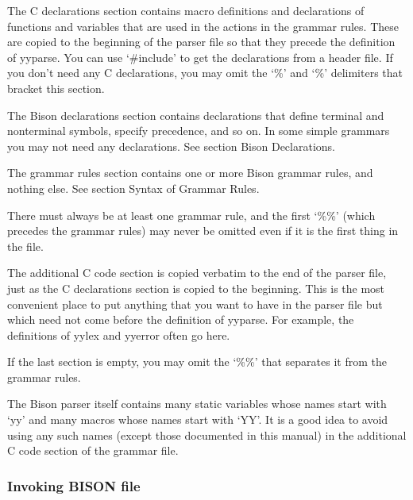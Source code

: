 
The C declarations section contains macro definitions and declarations of functions and variables that are used in the actions in the grammar rules. These are copied to the beginning of the parser file so that they precede the definition of yyparse. You can use `\#include' to get the declarations from a header file. If you don't need any C declarations, you may omit the `\%{' and `\%}' delimiters that bracket this section.


The Bison declarations section contains declarations that define terminal and nonterminal symbols, specify precedence, and so on. In some simple grammars you may not need any declarations. See section Bison Declarations.


The grammar rules section contains one or more Bison grammar rules, and nothing else. See section Syntax of Grammar Rules.

There must always be at least one grammar rule, and the first `\%\%' (which precedes the grammar rules) may never be omitted even if it is the first thing in the file.


The additional C code section is copied verbatim to the end of the parser file, just as the C declarations section is copied to the beginning. This is the most convenient place to put anything that you want to have in the parser file but which need not come before the definition of yyparse. For example, the definitions of yylex and yyerror often go here. \newline

 If the last section is empty, you may omit the `\%\%' that separates it from the grammar rules.\newline

The Bison parser itself contains many static variables whose names start with `yy' and many macros whose names start with `YY'. It is a good idea to avoid using any such names (except those documented in this manual) in the additional C code section of the grammar file.

\subsubsection{Invoking BISON file}

